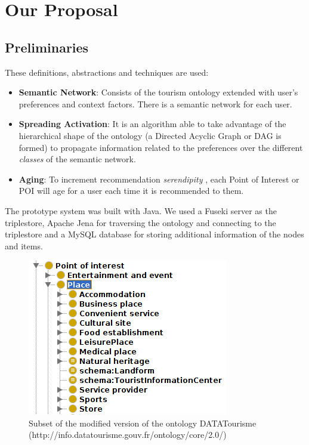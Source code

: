 \section{Our Proposal}

\subsection{Preliminaries}
These definitions, abstractions and techniques are used:
\begin{itemize}
\item \textbf{Semantic Network}: Consists of the tourism ontology extended with user's preferences and context factors. There is a semantic network for each user.
\item \textbf{Spreading Activation}: It is an algorithm able to take advantage of the hierarchical shape of the ontology (a Directed Acyclic Graph or DAG is formed) to propagate information related to the preferences over the different \textit{classes} of the semantic network.
\item \textbf{Aging}: To increment recommendation \textit{serendipity} \cite{kotkov2016survey}, each Point of Interest or POI will age for a user each time it is recommended to them.
\end{itemize}
The prototype system was built with Java. We used a Fuseki server as the triplestore, Apache Jena for traversing the ontology and connecting to the triplestore and a MySQL database for storing additional information of the nodes and items.

\begin{figure}[h]
\centering
\includegraphics[scale=0.5]{ontology.png}
\caption{Subset of the modified version of the ontology DATATourisme (http://info.datatourisme.gouv.fr/ontology/core/2.0/)}
\label{fig:ontology}
\end{figure}

